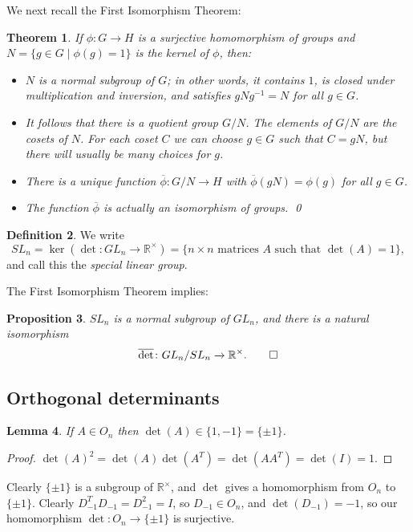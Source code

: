 \documentclass{amsart}
\newcommand{\Rt}        {{\mathbb{R}^\times}}
\newcommand{\st}        {\;|\;}
\newcommand{\tm}        {\times}
\newcommand{\xra}       {\xrightarrow}
\newcommand{\ov}[1]     {\overline{#1}}
\renewcommand{\:}{\colon}
\newtheorem{theorem}{Theorem}[section]
\newtheorem{lemma}[theorem]{Lemma}
\newtheorem{proposition}[theorem]{Proposition}
\theoremstyle{definition}
\newtheorem{definition}[theorem]{Definition}
\begin{document}
We next recall the First Isomorphism Theorem:
\begin{theorem}\label{thm-first-iso}
 If $\phi\:G\xra{}H$ is a surjective homomorphism of groups and
 $N=\{g\in G\st\phi(g)=1\}$ is the kernel of $\phi$, then:
 \begin{itemize}
  \item[(a)] $N$ is a normal subgroup of $G$; in other words, it
   contains $1$, is closed under multiplication and inversion, and
   satisfies $gNg^{-1}=N$ for all $g\in G$.
  \item[(b)] It follows that there is a quotient group $G/N$.  The
   elements of $G/N$ are the cosets of $N$.  For each coset $C$ we
   can choose $g\in G$ such that $C=gN$, but there will usually be
   many choices for $g$. 
  \item[(c)] There is a unique function $\ov{\phi}\:G/N\xra{}H$
   with $\ov{\phi}(gN)=\phi(g)$ for all $g\in G$.
  \item[(d)] The function $\ov{\phi}$ is actually an isomorphism of
   groups. \qed
 \end{itemize}
\end{theorem}

\begin{definition}
 We write
 \[ SL_n = \ker(\det\:GL_n\xra{}\Rt) =
    \{ n\tm n \text{ matrices } A \text{ such that } \det(A)=1\},
 \]
 and call this the \emph{special linear group}.
\end{definition}

The First Isomorphism Theorem implies:
\begin{proposition}
 $SL_n$ is a normal subgroup of $GL_n$, and there is a natural
 isomorphism
 \[ \ov{\det}\:GL_n/SL_n\xra{}\Rt. \qed\]
\end{proposition}

\subsection{Orthogonal determinants}

\begin{lemma}\label{lem-det-O}
 If $A\in O_n$ then $\det(A)\in\{1,-1\}=\{\pm 1\}$.
\end{lemma}
\begin{proof}
 $\det(A)^2=\det(A)\det(A^T)=\det(AA^T)=\det(I)=1$.
\end{proof}

Clearly $\{\pm 1\}$ is a subgroup of $\Rt$, and $\det$ gives a
homomorphism from $O_n$ to $\{\pm 1\}$.  Clearly
$D_{-1}^TD_{-1}=D_{-1}^2=I$, so $D_{-1}\in O_n$, and
$\det(D_{-1})=-1$, so our homomorphism $\det\:O_n\xra{}\{\pm 1\}$ is
surjective.
\end{document}
